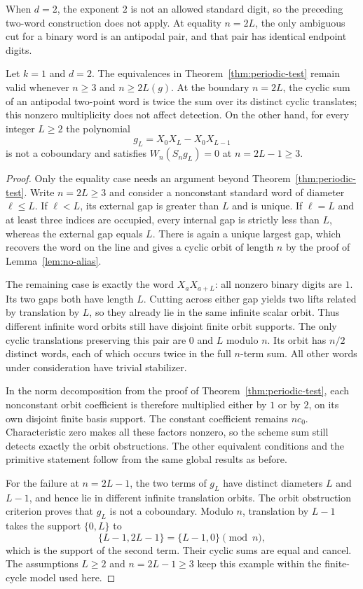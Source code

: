 When $d=2$, the exponent $2$ is not an allowed standard digit, so
the preceding two-word construction does not apply.  At equality
$n=2L$, the only ambiguous cut for a binary word is an antipodal
pair, and that pair has identical endpoint digits.

\begin{proposition}\label{prop:binary-boundary}
Let $k=1$ and $d=2$.  The equivalences in
Theorem~\ref{thm:periodic-test} remain valid whenever
$n\ge3$ and $n\ge2L(g)$.  At the boundary $n=2L$, the cyclic sum
of an antipodal two-point word is twice the sum over its distinct
cyclic translates; this nonzero multiplicity does not affect detection.
On the other hand, for every integer $L\ge2$ the polynomial
\[
 g_L=X_0X_L-X_0X_{L-1}
\]
is not a coboundary and satisfies
$W_n(S_ng_L)=0$ at $n=2L-1\ge3$.
\end{proposition}

\begin{proof}
Only the equality case needs an argument beyond
Theorem~\ref{thm:periodic-test}.  Write $n=2L\ge3$ and consider
a nonconstant standard word of diameter $\ell\le L$.
If $\ell<L$, its external gap is greater than $L$ and is unique.
If $\ell=L$ and at least three indices are occupied, every internal
gap is strictly less than $L$, whereas the external gap equals $L$.
There is again a unique largest gap, which recovers the word on
the line and gives a cyclic orbit of length $n$ by the proof of
Lemma~\ref{lem:no-alias}.

The remaining case is exactly the word $X_aX_{a+L}$: all nonzero
binary digits are $1$.  Its two gaps both have length $L$.
Cutting across either gap yields two lifts related by translation
by $L$, so they already lie in the same infinite scalar orbit.
Thus different infinite word orbits still have disjoint finite
orbit supports.  The only cyclic translations preserving this pair
are $0$ and $L$ modulo $n$.  Its orbit has $n/2$ distinct words,
each of which occurs twice in the full $n$-term sum.  All other
words under consideration have trivial stabilizer.

In the norm decomposition from the proof of
Theorem~\ref{thm:periodic-test}, each nonconstant orbit coefficient
is therefore multiplied either by $1$ or by $2$, on its own
disjoint finite basis support.  The constant coefficient remains
$nc_0$.  Characteristic zero makes all these factors nonzero,
so the scheme sum still detects exactly the orbit obstructions.
The other equivalent conditions and the primitive statement follow
from the same global results as before.

For the failure at $n=2L-1$, the two terms of $g_L$ have distinct
diameters $L$ and $L-1$, and hence lie in different infinite
translation orbits.  The orbit obstruction criterion proves that
$g_L$ is not a coboundary.  Modulo $n$, translation by $L-1$ takes
the support $\{0,L\}$ to
\[
 \{L-1,2L-1\}=\{L-1,0\}\pmod n,
\]
which is the support of the second term.  Their cyclic sums are
equal and cancel.  The assumptions $L\ge2$ and $n=2L-1\ge3$
keep this example within the finite-cycle model used here.
\end{proof}

